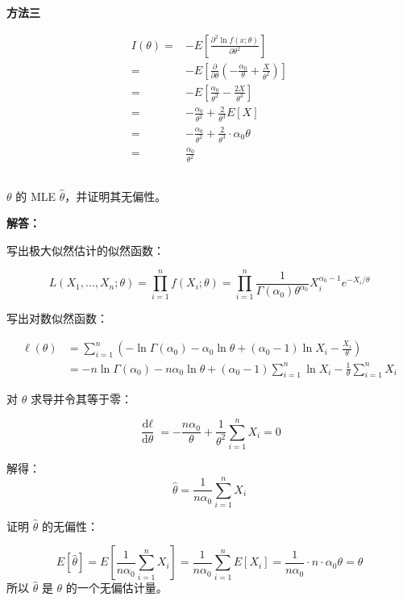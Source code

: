 \documentclass[12pt,a4paper]{article}
\begin{document}
\begin{answerbox}
\textbf{方法三}

$$
\begin{aligned}
I(\theta) = & -E\left[\frac{\partial^2 \ln f(x; \theta)}{\partial \theta^2}\right] \\
= & -E\left[\frac{\partial}{\partial \theta} \left(-\frac{\alpha_0}{\theta} + \frac{X}{\theta^2}\right)\right] \\
= & -E\left[\frac{\alpha_0}{\theta^2} - \frac{2X}{\theta^3}\right] \\
= & -\frac{\alpha_0}{\theta^2} + \frac{2}{\theta^3} E[X] \\
= & -\frac{\alpha_0}{\theta^2} + \frac{2}{\theta^3} \cdot \alpha_0 \theta \\
= & \frac{\alpha_0}{\theta^2}
\end{aligned}
$$

\end{answerbox}

\subsection{}

$\theta$ 的 MLE $\hat{\theta}$，并证明其无偏性。

\begin{answerbox}
\textbf{解答：}

写出极大似然估计的似然函数：

$$
L(X_1, \ldots, X_n; \theta) = \prod_{i=1}^n f(X_i; \theta) = \prod_{i=1}^n \frac{1}{\Gamma(\alpha_0) \theta^{\alpha_0}} X_i^{\alpha_0 - 1} e^{-X_i/\theta}
$$  

写出对数似然函数：

$$
\begin{aligned}
\ell(\theta) &= \sum_{i=1}^n \left( -\ln \Gamma(\alpha_0) - \alpha_0 \ln \theta + (\alpha_0 - 1) \ln X_i - \frac{X_i}{\theta} \right)  \\
&= -n \ln \Gamma(\alpha_0) - n\alpha_0 \ln \theta + (\alpha_0 - 1) \sum_{i=1}^n \ln X_i - \frac{1}{\theta} \sum_{i=1}^n X_i
\end{aligned}
$$


对 $\theta$ 求导并令其等于零：

$$
\frac{\text{d} \ell}{\text{d} \theta} = -\frac{n\alpha_0}{\theta} + \frac{1}{\theta^2} \sum_{i=1}^n X_i = 0
$$

解得：
$$
\hat{\theta} = \frac{1}{n\alpha_0} \sum_{i=1}^n X_i
$$

证明 $\hat{\theta}$ 的无偏性：

$$
E[\hat{\theta}] = E\left[\frac{1}{n\alpha_0} \sum_{i=1}^n X_i\right] = \frac{1}{n\alpha_0} \sum_{i=1}^n E[X_i] = \frac{1}{n\alpha_0} \cdot n \cdot \alpha_0 \theta = \theta
$$
所以 $\hat{\theta}$ 是 $\theta$ 的一个无偏估计量。
\end{answerbox}
\end{document}

